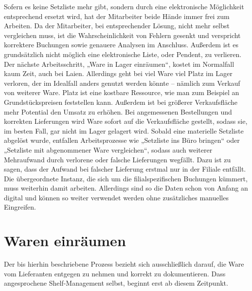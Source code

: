 Sofern es keine Setzliste mehr gibt, sondern durch eine elektronische Möglichkeit entsprechend ersetzt wird, hat der Mitarbeiter beide Hände immer frei zum Arbeiten. Da der Mitarbeiter, bei entsprechender Lösung, nicht mehr selbst vergleichen muss, ist die Wahrscheinlichkeit von Fehlern gesenkt und verspricht korrektere Buchungen sowie genauere Analysen im Anschluss. Außerdem ist es grundsätzlich nicht möglich eine elektronische Liste, oder Pendent, zu verlieren. 
Der nächste Arbeitsschritt, „Ware in Lager einräumen“, kostet im Normalfall kaum Zeit, auch bei Laien. Allerdings geht bei viel Ware viel Platz im Lager verloren, der im Idealfall anders genutzt werden könnte – nämlich zum Verkauf von weiterer  Ware. Platz ist eine kostbare Ressource, wie man zum Beispiel an Grundstückspreisen feststellen kann. Außerdem ist bei größerer Verkaufsfläche mehr Potential den Umsatz zu erhöhen. Bei angemessenen Bestellungen und korrekten Lieferungen wird Ware sofort auf die Verkaufsfläche gestellt, sodass sie, im besten Fall, gar nicht im Lager gelagert wird. 
Sobald eine materielle Setzliste abgelöst wurde, entfallen Arbeitsprozesse wie „Setzliste ins Büro bringen“ oder „Setzliste mit abgenommener Ware vergleichen“, sodass auch weiterer Mehraufwand durch verlorene oder falsche Lieferungen wegfällt. Dazu ist zu sagen, dass der Aufwand bei falscher Lieferung erstmal nur in der Filiale entfällt. Die übergeordnete Instanz, die sich um die filialspezifischen Buchungen kümmert, muss weiterhin damit arbeiten. Allerdings sind so die Daten schon von Anfang an digital und können so weiter verwendet werden ohne zusätzliches manuelles Eingreifen.

\section{Waren einräumen}
\label{waren_einräumen}
Der bis hierhin beschriebene Prozess bezieht sich ausschließlich darauf, die Ware vom Lieferanten entgegen zu nehmen und korrekt zu dokumentieren. Dass angesprochene Shelf-Management selbst, beginnt erst ab diesem Zeitpunkt.
\\


